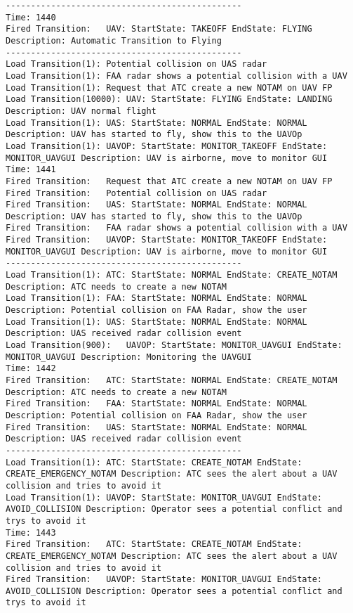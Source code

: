 \begin{spacing}{1}
\begin{verbatim}
-----------------------------------------------
Time: 1440
Fired Transition:	UAV: StartState: TAKEOFF EndState: FLYING Description: Automatic Transition to Flying
-----------------------------------------------
Load Transition(1):	Potential collision on UAS radar
Load Transition(1):	FAA radar shows a potential collision with a UAV
Load Transition(1):	Request that ATC create a new NOTAM on UAV FP
Load Transition(10000):	UAV: StartState: FLYING EndState: LANDING Description: UAV normal flight
Load Transition(1):	UAS: StartState: NORMAL EndState: NORMAL Description: UAV has started to fly, show this to the UAVOp
Load Transition(1):	UAVOP: StartState: MONITOR_TAKEOFF EndState: MONITOR_UAVGUI Description: UAV is airborne, move to monitor GUI
Time: 1441
Fired Transition:	Request that ATC create a new NOTAM on UAV FP
Fired Transition:	Potential collision on UAS radar
Fired Transition:	UAS: StartState: NORMAL EndState: NORMAL Description: UAV has started to fly, show this to the UAVOp
Fired Transition:	FAA radar shows a potential collision with a UAV
Fired Transition:	UAVOP: StartState: MONITOR_TAKEOFF EndState: MONITOR_UAVGUI Description: UAV is airborne, move to monitor GUI
-----------------------------------------------
Load Transition(1):	ATC: StartState: NORMAL EndState: CREATE_NOTAM Description: ATC needs to create a new NOTAM
Load Transition(1):	FAA: StartState: NORMAL EndState: NORMAL Description: Potential collision on FAA Radar, show the user
Load Transition(1):	UAS: StartState: NORMAL EndState: NORMAL Description: UAS received radar collision event
Load Transition(900):	UAVOP: StartState: MONITOR_UAVGUI EndState: MONITOR_UAVGUI Description: Monitoring the UAVGUI
Time: 1442
Fired Transition:	ATC: StartState: NORMAL EndState: CREATE_NOTAM Description: ATC needs to create a new NOTAM
Fired Transition:	FAA: StartState: NORMAL EndState: NORMAL Description: Potential collision on FAA Radar, show the user
Fired Transition:	UAS: StartState: NORMAL EndState: NORMAL Description: UAS received radar collision event
-----------------------------------------------
Load Transition(1):	ATC: StartState: CREATE_NOTAM EndState: CREATE_EMERGENCY_NOTAM Description: ATC sees the alert about a UAV collision and tries to avoid it
Load Transition(1):	UAVOP: StartState: MONITOR_UAVGUI EndState: AVOID_COLLISION Description: Operator sees a potential conflict and trys to avoid it
Time: 1443
Fired Transition:	ATC: StartState: CREATE_NOTAM EndState: CREATE_EMERGENCY_NOTAM Description: ATC sees the alert about a UAV collision and tries to avoid it
Fired Transition:	UAVOP: StartState: MONITOR_UAVGUI EndState: AVOID_COLLISION Description: Operator sees a potential conflict and trys to avoid it

\end{verbatim}
\end{spacing}

